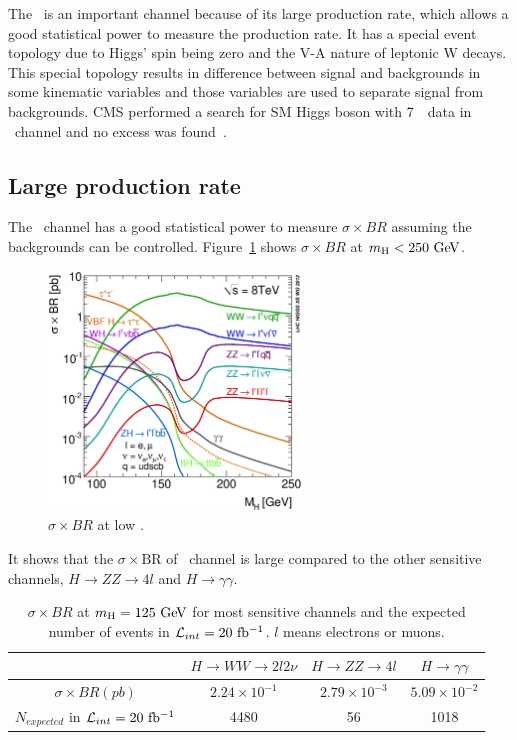 The \hww\ is an important channel because of its large production rate, 
which allows a good statistical power to measure the production rate. 
It has a special event topology due to Higgs' spin being zero and 
the V-A nature of leptonic W decays. This special topology results 
in difference between signal and backgrounds in some kinematic variables
and those variables are used to separate signal from backgrounds. 
CMS performed a search for SM Higgs boson with 7~\TeV\ data
in \hww\ channel and no excess was found~\cite{Chatrchyan:2012ty}. 

%
\subsection{Large production rate}

The \hww\ channel has a good statistical power to measure $\sigma \times BR$
assuming the backgrounds can be controlled.
Figure~\ref{fig:XSBR_8TeV_SM_LM} shows $\sigma \times BR$ at $m_{\mathrm{H}}<250~\mathrm{Ge\kern -0.1em V}$.
\begin{figure}[t]
\centering
\includegraphics[width=0.6\textwidth]{figures/XSBR_8TeV_SM_LM.eps}
\caption{$\sigma \times BR$ at low \mHi.}
\label{fig:XSBR_8TeV_SM_LM}
\end{figure}
It shows that the $\sigma \times \textrm{BR}$ of \hww\ channel 
is large compared to the other sensitive channels, $H \rightarrow ZZ\rightarrow 4l$
and $H \rightarrow\gamma\gamma$. 
\begin{table}[htb]
\centering
\vspace{0.5cm} 
\caption{$\sigma \times BR$ at $m_{\mathrm{H}}=125~\mathrm{Ge\kern -0.1em V}$ for most sensitive channels 
and the expected number of events in $\mathcal{L}_{int} = 20~\mathrm{fb^{-1}}$.
$l$ means electrons or muons.}
\vspace{0.5cm} 
\begin{tabular}{c | c c c}
\hline 
        & $H \rightarrow WW \rightarrow 2l2\nu$   & $H \rightarrow ZZ\rightarrow 4l$ 
        & $H \rightarrow\gamma\gamma$  \\
\hline \hline 
$\sigma \times BR (pb)$  
        & $2.24\times10^{-1}$ &  $2.79\times10^{-3}$ & $5.09\times10^{-2}$ \\ 
$N_{expected}$ in $\mathcal{L}_{int} = 20~\mathrm{fb^{-1}}$ 
        & 4480 &  56 & 1018 \\ 
\hline 
\end{tabular}
\label{tab:XSBR_8TeV_SM_125}
\end{table}
